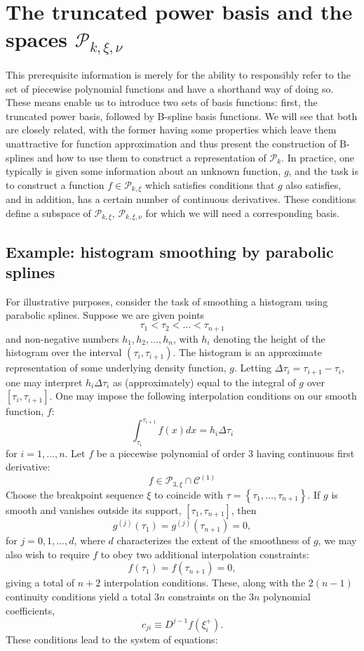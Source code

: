 \documentclass[12pt]{article}
\newcommand{\PP}{\mathcal{P}}
\theoremstyle{definition}
\begin{document}
 \section{The truncated power basis and the spaces $\PP_{k,\xi,\nu}$}
This prerequisite information is merely for the ability to responsibly refer to the set of piecewise polynomial functions and have a shorthand way of doing so. These means enable us to introduce two sets of basis functions: first, the truncated power basis, followed by B-spline basis functions. We will see that both are closely related, with the former having some properties which leave them unattractive for function approximation and thus present the construction of B-splines and how to use them to construct a representation of $\mathcal{P}_{k}$. In practice, one typically is given some information about an unknown function, $g$, and the task is to construct a function $f \in \PP_{k, \xi}$ which satisfies conditions that $g$ also satisfies, and in addition, has a certain number of continuous derivatives. These conditions define a subspace of $\PP_{k,\xi}$, $\PP_{k,\xi, \nu}$ for which we will need a corresponding basis.


\subsection{Example: histogram smoothing by parabolic splines}
For illustrative purposes, consider the task of smoothing a histogram using parabolic splines. Suppose we are given points
\[
\tau_1 < \tau_2 < \dots < \tau_{n+1}
\]
and non-negative numbers $h_1, h_2, \dots, h_n$, with $h_i$ denoting the height of the histogram over the interval $\left(\tau_i, \tau_{i+1} \right)$. The histogram is an approximate representation of some underlying density function, $g$. Letting $\Delta \tau_i = \tau_{i+1}-\tau_i$, one may interpret $h_i\Delta \tau_i$ as (approximately) equal to the integral of $g$ over $\left[\tau_i, \tau_{i+1} \right]$. One may impose the following interpolation conditions on our smooth function, $f$:
\begin{equation*} 
\int_{\tau_i}^{\tau_{i+1}} f\left(x\right)dx = h_i\Delta \tau_i
\end{equation*} 
\noindent
for $i=1,\dots, n$. Let $f$ be a piecewise polynomial of order 3 having continuous first derivative:
\[
f \in \PP_{3,\xi} \cap \mathcal{C}^{\left(1\right)}
\]
Choose the breakpoint sequence $\xi$ to coincide with $\tau = \left\{\tau_1,\dots, \tau_{n+1} \right\}$. If $g$ is smooth and vanishes outside its support, $\left[ \tau_1,\tau_{n+1} \right]$, then
\[
g^{\left( j \right)}\left(\tau_1\right) = g^{\left( j \right)}\left(\tau_{n+1}\right) = 0,
\]
\noindent
for $j=0,1,\dots,d$, where $d$ characterizes the extent of the smoothness of $g$, we may also wish to require $f$ to obey two additional interpolation constraints:
\[
f\left( \tau_1 \right) = f\left( \tau_{n+1} \right) = 0,
\]
giving a total of $n+2$ interpolation conditions. These, along with the $2\left(n-1\right)$ continuity conditions yield a total $3n$ constraints on the $3n$ polynomial coefficients,
\[
c_{ji} \equiv D^{j-1} f\left(\xi_i^+ \right).
\]
These conditions lead to the system of equations:
\end{document}
